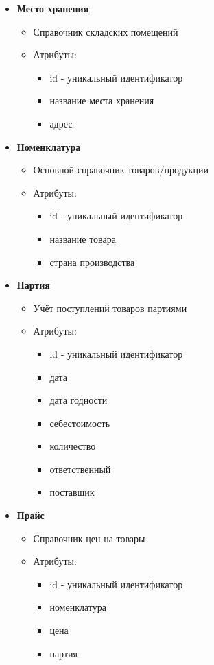 \begin{itemize}
	\item \textbf{Место хранения}
	\begin{itemize}
		\item Справочник складских помещений
		\item Атрибуты:
		\begin{itemize}
			\item id - уникальный идентификатор
			\item название места хранения
			\item адрес
		\end{itemize}
	\end{itemize}
	
	\item \textbf{Номенклатура}
	\begin{itemize}
		\item Основной справочник товаров/продукции
		\item Атрибуты:
		\begin{itemize}
			\item id - уникальный идентификатор
			\item название товара
			\item страна производства
		\end{itemize}
	\end{itemize}
	
	\item \textbf{Партия}
	\begin{itemize}
		\item Учёт поступлений товаров партиями
		\item Атрибуты:
		\begin{itemize}
			\item id - уникальный идентификатор
			\item дата
			\item дата годности
			\item себестоимость
			\item количество
			\item ответственный
			\item поставщик
		\end{itemize}
	\end{itemize}
	
	\item \textbf{Прайс}
	\begin{itemize}
		\item Справочник цен на товары
		\item Атрибуты:
		\begin{itemize}
			\item id - уникальный идентификатор
			\item номенклатура
			\item цена
			\item партия
		\end{itemize}
	\end{itemize}
\end{itemize}

